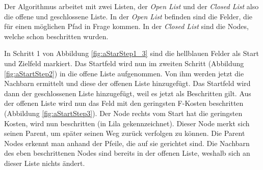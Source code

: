 Der Algorithmus arbeitet mit zwei Listen, der \textit{Open List} und der \textit{Closed List} also die offene und geschlossene Liste. In der \textit{Open List} befinden sind die Felder, die für einen möglichen Pfad in Frage kommen. In der \textit{Closed List} sind die Nodes, welche schon beschritten wurden.

In Schritt 1 von Abbildung \ref{fig:aStarStep1_3} sind die hellblauen Felder als Start und Zielfeld markiert. Das Startfeld wird nun im zweiten Schritt (Abbildung \ref{fig:aStartStep2}) in die offene Liste aufgenommen. Von ihm werden jetzt die Nachbarn ermittelt und diese der offenen Liste hinzugefügt. Das Startfeld wird dann der geschlossenen Liste hinzugefügt, weil es jetzt als Beschritten gilt. Aus der offenen Liste wird nun das Feld mit den geringsten F-Kosten beschritten (Abbildung \ref{fig:aStartStep3}). Der Node rechts vom Start hat die geringsten Kosten, wird nun beschritten (in Lila gekennzeichnet). Dieser Node merkt sich seinen Parent, um später seinen Weg zurück verfolgen zu können. Die Parent Nodes erkennt man anhand der Pfeile, die auf sie gerichtet sind. Die Nachbarn des eben beschrittenen Nodes sind bereits in der offenen Liste, weshalb sich an dieser Liste nichts ändert.

